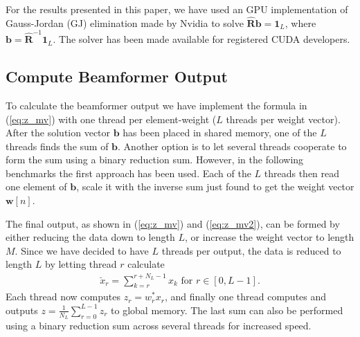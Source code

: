 \documentclass[12pt,journal,onecolumn]{IEEEtran}
\newcommand{\mat}[1]{\mathbf{#1}}
\renewcommand{\vec}[1]{\mathbf{#1}}
\begin{document}
For the results presented in this paper, we have used an GPU implementation of Gauss-Jordan (GJ) elimination made by Nvidia to solve $\mat{\hat{R}}\vec{b} = \vec{1}_L$, where $\vec{b} = \mat{\hat{R}}^{-1}\vec{1}_L$. The solver has been made available for registered CUDA developers.%





\subsection{Compute Beamformer Output}
To calculate the beamformer output we have implement the formula in (\ref{eq:z_mv}) with one thread per element-weight ($L$ threads per weight vector). After the solution vector $\vec{b}$ has been placed in shared memory, one of the $L$ threads finds the sum of $\vec{b}$. Another option is to let several threads cooperate to form the sum using a binary reduction sum. However, in the following benchmarks the first approach has been used. Each of the $L$ threads then read one element of $\vec{b}$, scale it with the inverse sum just found to get the weight vector $\vec{w}[n]$. 

The final output, as shown in (\ref{eq:z_mv}) and (\ref{eq:z_mv2}), can be formed by either reducing the data down to length $L$, or increase the weight vector to length $M$. Since we have decided to have $L$ threads per output, the data is reduced to length $L$ by letting thread $r$ calculate 
\begin{align}\label{eq:subsum}
\breve{x}_{r} = \sum_{k=r}^{r+N_L-1}x_{k} \text{ for } r \in [0, L-1].
\end{align}
Each thread now computes $z_r = w_r^*x_r$, and finally one thread computes and outputs $z = \frac{1}{N_L}\sum_{r=0}^{L-1} z_r$ to global memory. The last sum can also be performed using a binary reduction sum across several threads for increased speed.
\end{document}
